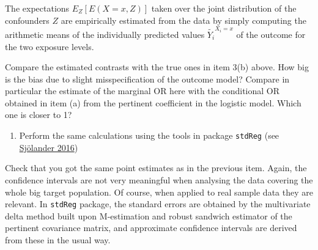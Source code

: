 \documentclass[
]{book}
\newenvironment{Shaded}{\begin{snugshade}}{\end{snugshade}}
\newcommand{\AttributeTok}[1]{\textcolor[rgb]{0.13,0.29,0.53}{#1}}
\newcommand{\DecValTok}[1]{\textcolor[rgb]{0.00,0.00,0.81}{#1}}
\newcommand{\FunctionTok}[1]{\textcolor[rgb]{0.13,0.29,0.53}{\textbf{#1}}}
\newcommand{\NormalTok}[1]{#1}
\newcommand{\OtherTok}[1]{\textcolor[rgb]{0.56,0.35,0.01}{#1}}
\newcommand{\SpecialCharTok}[1]{\textcolor[rgb]{0.81,0.36,0.00}{\textbf{#1}}}
\newcommand{\StringTok}[1]{\textcolor[rgb]{0.31,0.60,0.02}{#1}}
\providecommand{\tightlist}{%
  \setlength{\itemsep}{0pt}\setlength{\parskip}{0pt}}
\begin{document}
The expectations \(E_Z[E(X=x, Z)]\) taken over the joint
distribution of the confounders \(Z\) are
empirically estimated from the data by simply computing the
arithmetic means of the individually
predicted values \(\widetilde{Y_i}^{X_i=x}\)
of the outcome for the two exposure levels.

Compare the estimated contrasts with the true ones in item 3(b) above.
How big is the bias due to
slight misspecification of the outcome model?
Compare in particular the estimate of the marginal OR here with
the conditional OR obtained in item (a) from the pertinent
coefficient in the logistic model. Which one is closer to 1?

\begin{enumerate}
\def\labelenumi{\arabic{enumi}.}
\setcounter{enumi}{3}
\tightlist
\item
  Perform the same calculations using the tools in package
  \texttt{stdReg}
  (see \href{https://doi.org/10.1007/s10654-016-0157-3}{Sjölander 2016})
\end{enumerate}

\begin{Shaded}
\end{Shaded}

Check that you got the same point estimates as in the previous item.
Again, the confidence intervals are not very meaningful when
analysing the data covering the whole
big target population. Of course, when applied to real sample data they are
relevant. In \texttt{stdReg} package, the standard errors are
obtained by the multivariate delta method
built upon M-estimation and robust sandwich estimator of the
pertinent covariance matrix,
and approximate confidence intervals are derived from these
in the usual way.
\end{document}
